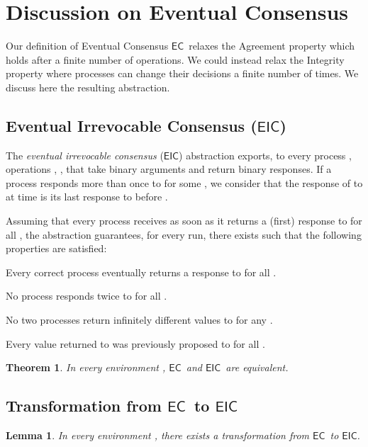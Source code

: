 \documentclass[11pt]{article}
\newtheorem{lemma}{Lemma}
\newtheorem{theorem}{Theorem}
\newcommand{\EC}{\ensuremath{\mathsf{EC}}}
\newcommand{\EIC}{\ensuremath{\mathsf{EIC}}}
\begin{document}
\section{Discussion on Eventual Consensus}
\label{app:eic}


Our definition of Eventual Consensus \EC~relaxes the Agreement property which holds after a finite number of operations. We could instead relax the Integrity property where processes can change their decisions a finite number of times. We discuss here the resulting abstraction.

\subsection{Eventual Irrevocable Consensus (\EIC)}

The \emph{eventual irrevocable consensus} (\EIC) abstraction exports, to every process , operations , ,  that take binary arguments and return binary responses. If a process  responds more than once to  for some , we consider that the response of  to  at time  is its last response to  before .

Assuming that every process receives  as soon as it returns a (first) response to  for all , the abstraction guarantees, for every run, there exists  such that the following properties are satisfied:

\begin{description}\itemsep0pt
\item[\EIC-Termination] Every correct process eventually returns a response to  for all .
\item[\EIC-Integrity] No process responds twice to  for all .
\item[\EIC-Agreement] No two processes return infinitely different values to  for any .
\item[\EIC-Validity] Every value returned to  was previously proposed to  for all .
\end{description}

\begin{theorem}\label{th:EquivalenceECEIC}
In every environment , \EC~and \EIC~are equivalent.
\end{theorem}

\subsection{Transformation from \EC~to \EIC}

\begin{lemma}\label{lem:ECtoEIC}
In every environment , there exists a transformation from \EC~to \EIC.
\end{lemma}
\end{document}

